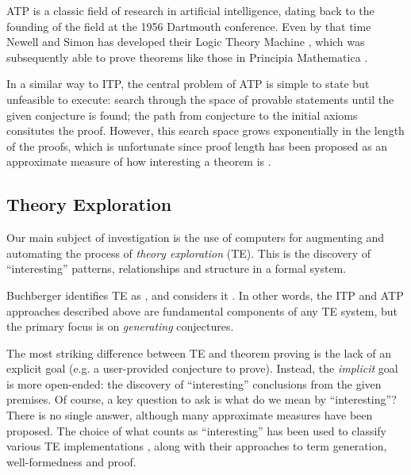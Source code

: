 \documentclass[]{article}
\begin{document}
ATP is a classic field of research in artificial intelligence, dating back to the founding of the field at the 1956 Dartmouth conference. Even by that time Newell and Simon has developed their Logic Theory Machine \cite{newell1956logic}, which was subsequently able to prove theorems like those in Principia Mathematica \cite{newell1958elements}.

In a similar way to ITP, the central problem of ATP is simple to state but unfeasible to execute: search through the space of provable statements until the given conjecture is found; the path from conjecture to the initial axioms consitutes the proof. However, this search space grows exponentially in the length of the proofs, which is unfortunate since proof length has been proposed as an approximate measure of how interesting a theorem is \cite[\S~10.2.1]{colton2012automated}.

\subsection{Theory Exploration}

Our main subject of investigation is the use of computers for augmenting and automating the process of \emph{theory exploration} (TE). This is the discovery of ``interesting'' patterns, relationships and structure in a formal system.

Buchberger identifies TE as  \cite{buchberger2004algorithm}, and considers it  \cite{buchberger2000theory}. In other words, the ITP and ATP approaches described above are fundamental components of any TE system, but the primary focus is on \emph{generating} conjectures.

The most striking difference between TE and theorem proving is the lack of an explicit goal (e.g. a user-provided conjecture to prove). Instead, the \emph{implicit} goal is more open-ended: the discovery of ``interesting'' conclusions from the given premises. Of course, a key question to ask is what do we mean by ``interesting''? There is no single answer, although many approximate measures have been proposed. The choice of what counts as ``interesting'' has been used to classify various TE implementations \cite{warburtonscaling}, along with their approaches to term generation, well-formedness and proof.
\end{document}
